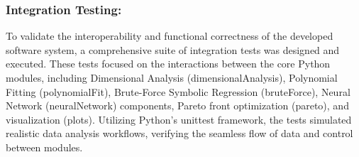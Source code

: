 \documentclass{article}
\begin{document}
\begin{table}[]
\end{table}



\subsubsection{Integration Testing: }


To validate the interoperability and functional correctness of the developed software system, a comprehensive suite of integration tests was designed and executed. These tests focused on the interactions between the core Python modules, including Dimensional Analysis (dimensionalAnalysis), Polynomial Fitting (polynomialFit), Brute-Force Symbolic Regression (bruteForce), Neural Network (neuralNetwork) components, Pareto front optimization (pareto), and visualization (plots). Utilizing Python's unittest framework, the tests simulated realistic data analysis workflows, verifying the seamless flow of data and control between modules.\\
\end{document}

